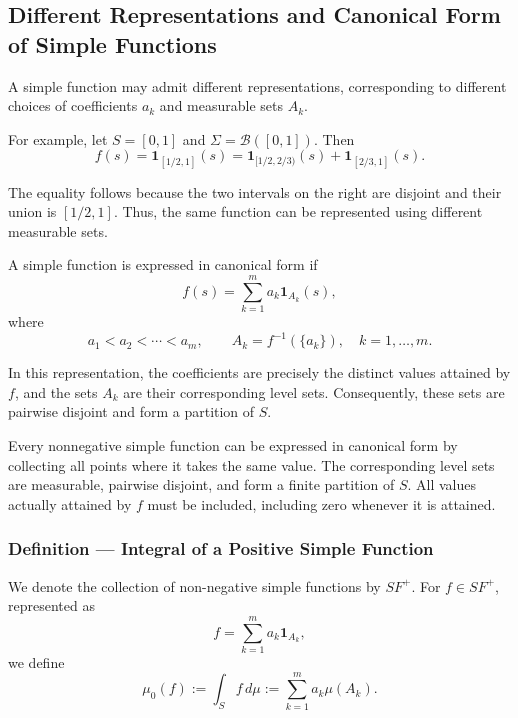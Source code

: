 \subsection*{Different Representations and Canonical Form of Simple Functions}%
%


A simple function may admit different representations, corresponding to different choices of coefficients $a_k$ and measurable sets $A_k$.

For example, let $S=[0,1]$ and $\Sigma=\mathcal B([0,1])$. Then
\[
f(s)=\mathbf{1}_{[1/2,1]}(s)
=\mathbf{1}_{[1/2,2/3)}(s)
+\mathbf{1}_{[2/3,1]}(s).
\]

The equality follows because the two intervals on the right are disjoint and their union is $[1/2,1]$. Thus, the same function can be represented using different measurable sets.

A simple function is expressed in canonical form if
\[
f(s)=\sum_{k=1}^{m}a_k\mathbf{1}_{A_k}(s),
\]
where
\[
a_1<a_2<\cdots<a_m,
\qquad
A_k=f^{-1}(\{a_k\}),
\quad k=1,\ldots,m.
\]

In this representation, the coefficients are precisely the distinct values attained by $f$, and the sets $A_k$ are their corresponding level sets. Consequently, these sets are pairwise disjoint and form a partition of $S$.

Every nonnegative simple function can be expressed in canonical form by collecting all points where it takes the same value. The corresponding level sets are measurable, pairwise disjoint, and form a finite partition of $S$. All values actually attained by $f$ must be included, including zero whenever it is attained.

\subsubsection*{Definition --- Integral of a Positive Simple Function}%
%


We denote the collection of non-negative simple functions by $SF^+$. For $f\in SF^+$, represented as
\[
f=\sum_{k=1}^{m}a_k\mathbf{1}_{A_k},
\]
we define
\[
\mu_0(f):=\int_S f\,d\mu
:=\sum_{k=1}^{m}a_k\mu(A_k).
\]

